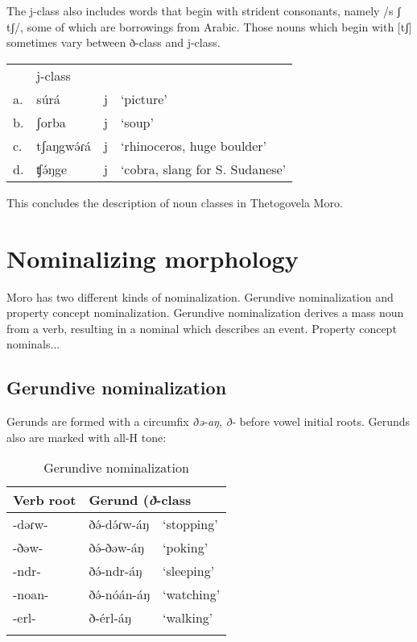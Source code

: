 The j-class also includes words that begin with strident consonants, namely /s ʃ tʃ/, some of which are borrowings from Arabic. Those nouns which begin with [tʃ] sometimes vary between ð-class and j-class. 

\ea	
\begin{tabular}[t]{llll}
&	j-class\\
a.	&	súrá	&	j	&	‘picture’\\
b.	&	ʃorba	&	j	&	‘soup’\\
c.	&	tʃaŋgwə́ɾá&	j	&	‘rhinoceros, huge boulder’\\
d.	&	ʧə́ŋge	&	j	&	‘cobra, slang for S. Sudanese’\\
\end{tabular}
\z

This concludes the description of noun classes in Thetogovela Moro. 

\section{Nominalizing morphology}

Moro has two different kinds of nominalization. Gerundive nominalization and property concept nominalization. Gerundive nominalization derives a mass noun from a verb, resulting in a nominal which describes an event. Property concept nominals...

\subsection{Gerundive nominalization}\label{section:gerund}

Gerunds are formed with a circumfix \textit{ðə-aŋ}, \textit{ð-} before vowel initial roots. Gerunds also are marked with all-H tone:

\begin{table}
\caption{Gerundive nominalization}
\begin{tabular}[t]{lll} %
\lsptoprule
Verb root	&	\multicolumn{2}{l}{Gerund (\textit{ð}-class}  	\\
\midrule
-dəɾw-	&	ðə́-də́ɾw-áŋ	&	‘stopping’\\
-ðəw-	&	ðə́-ðəw-áŋ & 	‘poking’\\
-ndr- 	&	ðə́-ndr-áŋ & ‘sleeping’\\
-noan-	&	ðə́-nóán-áŋ & ‘watching’\\
-erl-		& 	ð-érl-áŋ & `walking' \\
\lspbottomrule
\end{tabular}	
\end{table}


